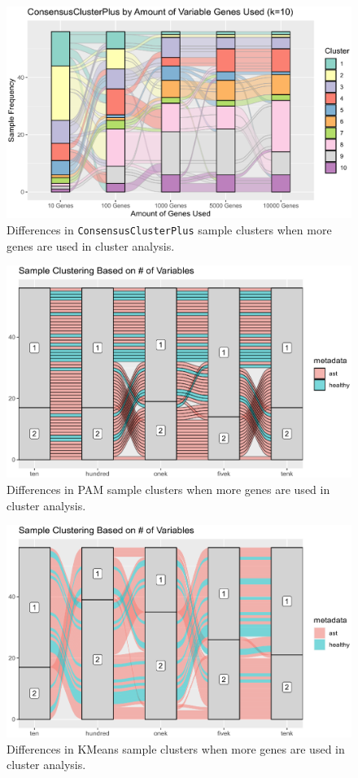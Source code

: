 \documentclass[pdflatex,sn-mathphys]{sn-jnl}%
\theoremstyle{thmstyleone}%
\theoremstyle{thmstyletwo}%
\theoremstyle{thmstylethree}%
\begin{document}
\begin{figure}[h]
    \centering
    \includegraphics[scale=0.6]{plots/assn3/Alluvials/Alluvial_CCC.eps}
    \caption{Differences in \texttt{ConsensusClusterPlus} sample clusters when more genes are used in cluster analysis.}
    \label{fig:ccpalluvial}
\end{figure}
\begin{figure}[h]
    \centering
    \includegraphics[scale=0.6]{plots/assn3/Alluvials/Alluvial_PAM.eps}
    \caption{Differences in PAM sample clusters when more genes are used in cluster analysis.}
    \label{fig:pamalluvial}
\end{figure}
\begin{figure}[h]
    \centering
    \includegraphics[scale=0.6]{plots/assn3/Alluvials/Alluvial_KMeans.eps}
    \caption{Differences in KMeans sample clusters when more genes are used in cluster analysis.}
    \label{fig:kmeansalluvial}
\end{figure}
\end{document}
